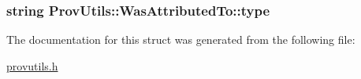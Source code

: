 \hypertarget{struct_prov_utils_1_1_was_attributed_to_a0f0bb67866aaed93ef28d366f31ebede}{
\subsubsection[{type}]{\setlength{\rightskip}{0pt plus 5cm}string Prov\-Utils\-::\-Was\-Attributed\-To\-::type}}\label{struct_prov_utils_1_1_was_attributed_to_a0f0bb67866aaed93ef28d366f31ebede}


The documentation for this struct was generated from the following file\-:\begin{DoxyCompactItemize}
\item 
\hyperlink{provutils_8h}{provutils.\-h}\end{DoxyCompactItemize}
